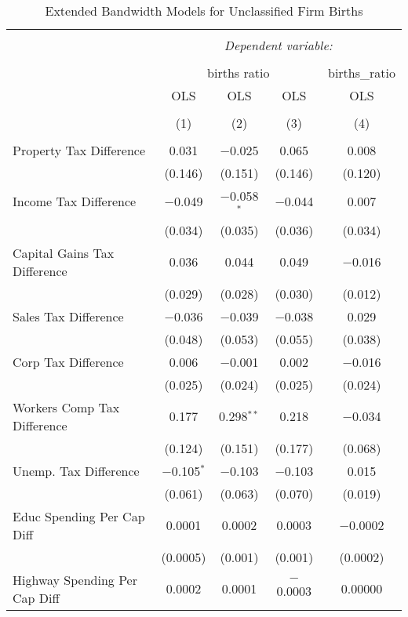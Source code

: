
\begin{table}[!htbp] \centering 
  \caption{Extended Bandwidth Models for  Unclassified Firm Births} 
  \label{99eb} 
\begin{tabular}{@{\extracolsep{5pt}}lcccc} 
\\[-1.8ex]\hline 
\hline \\[-1.8ex] 
 & \multicolumn{4}{c}{\textit{Dependent variable:}} \\ 
\cline{2-5} 
\\[-1.8ex] & \multicolumn{3}{c}{births ratio} & births\_ratio \\ 
 & OLS & OLS & OLS & OLS \\ 
\\[-1.8ex] & (1) & (2) & (3) & (4)\\ 
\hline \\[-1.8ex] 
 Property Tax Difference & 0.031 & $-$0.025 & 0.065 & 0.008 \\ 
  & (0.146) & (0.151) & (0.146) & (0.120) \\ 
  Income Tax Difference & $-$0.049 & $-$0.058$^{*}$ & $-$0.044 & 0.007 \\ 
  & (0.034) & (0.035) & (0.036) & (0.034) \\ 
  Capital Gains Tax Difference & 0.036 & 0.044 & 0.049 & $-$0.016 \\ 
  & (0.029) & (0.028) & (0.030) & (0.012) \\ 
  Sales Tax Difference & $-$0.036 & $-$0.039 & $-$0.038 & 0.029 \\ 
  & (0.048) & (0.053) & (0.055) & (0.038) \\ 
  Corp Tax Difference & 0.006 & $-$0.001 & 0.002 & $-$0.016 \\ 
  & (0.025) & (0.024) & (0.025) & (0.024) \\ 
  Workers Comp Tax Difference & 0.177 & 0.298$^{**}$ & 0.218 & $-$0.034 \\ 
  & (0.124) & (0.151) & (0.177) & (0.068) \\ 
  Unemp. Tax Difference & $-$0.105$^{*}$ & $-$0.103 & $-$0.103 & 0.015 \\ 
  & (0.061) & (0.063) & (0.070) & (0.019) \\ 
  Educ Spending Per Cap Diff & 0.0001 & 0.0002 & 0.0003 & $-$0.0002 \\ 
  & (0.0005) & (0.001) & (0.001) & (0.0002) \\ 
  Highway Spending Per Cap Diff & 0.0002 & 0.0001 & $-$0.0003 & 0.00000 \\ 

\end{tabular}
\end{table}
